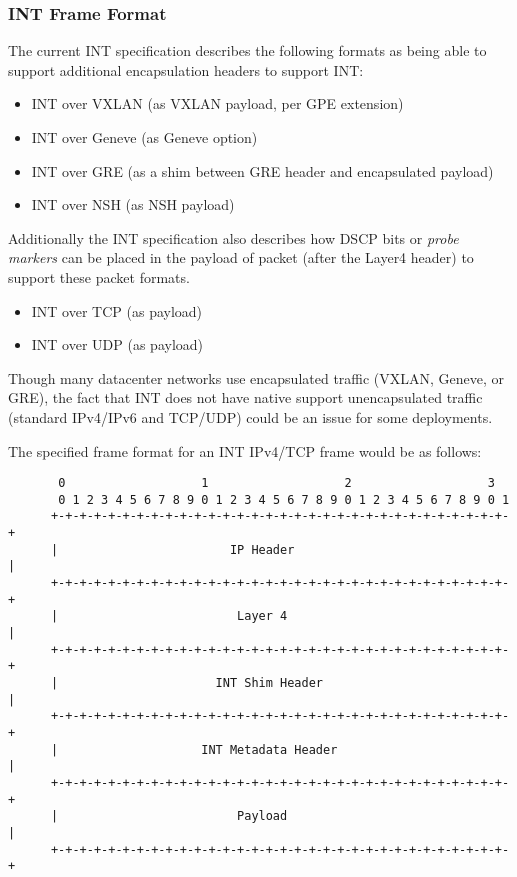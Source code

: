 \documentclass[letterpaper,twocolumn,10pt]{article}
\begin{document}
\subsubsection{INT Frame Format}

The current INT specification describes the following formats as being able to
support additional encapsulation headers to support INT:

\begin{itemize}
\item INT over VXLAN (as VXLAN payload, per GPE extension)
\item INT over Geneve (as Geneve option)
\item INT over GRE (as a shim between GRE header and encapsulated payload)
\item INT over NSH (as NSH payload)
\end{itemize}

Additionally the INT specification also describes how DSCP bits or
\textit{probe markers} can be placed in the payload of packet (after the Layer4
header) to support these packet formats.

\begin{itemize}
\item INT over TCP (as payload)
\item INT over UDP (as payload)
\end{itemize}

Though many datacenter networks use encapsulated traffic (VXLAN, Geneve,
or GRE), the fact that INT does not have native support unencapsulated
traffic (standard IPv4/IPv6 and TCP/UDP) could be an issue for some
deployments.

The specified frame format for an INT IPv4/TCP frame would be as follows:

\begin{center}
\tiny
\begin{verbatim}
       0                   1                   2                   3
       0 1 2 3 4 5 6 7 8 9 0 1 2 3 4 5 6 7 8 9 0 1 2 3 4 5 6 7 8 9 0 1
      +-+-+-+-+-+-+-+-+-+-+-+-+-+-+-+-+-+-+-+-+-+-+-+-+-+-+-+-+-+-+-+-+
      |                        IP Header                              |
      +-+-+-+-+-+-+-+-+-+-+-+-+-+-+-+-+-+-+-+-+-+-+-+-+-+-+-+-+-+-+-+-+
      |                         Layer 4                               |
      +-+-+-+-+-+-+-+-+-+-+-+-+-+-+-+-+-+-+-+-+-+-+-+-+-+-+-+-+-+-+-+-+
      |                      INT Shim Header                          |
      +-+-+-+-+-+-+-+-+-+-+-+-+-+-+-+-+-+-+-+-+-+-+-+-+-+-+-+-+-+-+-+-+
      |                    INT Metadata Header                        |
      +-+-+-+-+-+-+-+-+-+-+-+-+-+-+-+-+-+-+-+-+-+-+-+-+-+-+-+-+-+-+-+-+
      |                         Payload                               |
      +-+-+-+-+-+-+-+-+-+-+-+-+-+-+-+-+-+-+-+-+-+-+-+-+-+-+-+-+-+-+-+-+
\end{verbatim}
\normalsize
\end{center}
\end{document}
